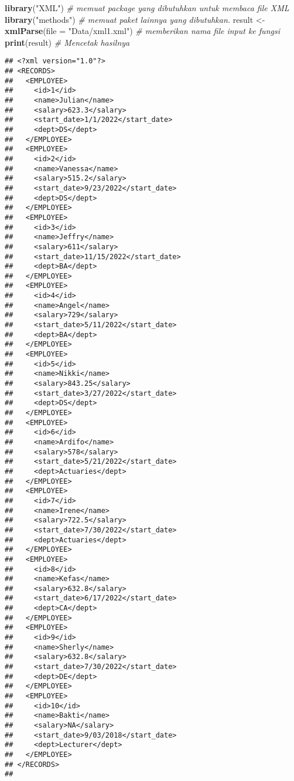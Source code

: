 \documentclass[
]{book}
\newenvironment{Shaded}{\begin{snugshade}}{\end{snugshade}}
\newcommand{\CommentTok}[1]{\textcolor[rgb]{0.56,0.35,0.01}{\textit{#1}}}
\newcommand{\DataTypeTok}[1]{\textcolor[rgb]{0.13,0.29,0.53}{#1}}
\newcommand{\KeywordTok}[1]{\textcolor[rgb]{0.13,0.29,0.53}{\textbf{#1}}}
\newcommand{\NormalTok}[1]{#1}
\newcommand{\StringTok}[1]{\textcolor[rgb]{0.31,0.60,0.02}{#1}}
\begin{document}
\begin{Shaded}
\begin{Highlighting}[]
\KeywordTok{library}\NormalTok{(}\StringTok{"XML"}\NormalTok{)                                     }\CommentTok{# memuat package yang dibutuhkan untuk membaca file XML}
\KeywordTok{library}\NormalTok{(}\StringTok{"methods"}\NormalTok{)                                 }\CommentTok{# memuat paket lainnya yang dibutuhkan.}
\NormalTok{result <-}\StringTok{ }\KeywordTok{xmlParse}\NormalTok{(}\DataTypeTok{file =} \StringTok{"Data/xml1.xml"}\NormalTok{)         }\CommentTok{# memberikan nama file input ke fungsi}
\KeywordTok{print}\NormalTok{(result)                                      }\CommentTok{# Mencetak hasilnya}
\end{Highlighting}
\end{Shaded}

\begin{verbatim}
## <?xml version="1.0"?>
## <RECORDS>
##   <EMPLOYEE>
##     <id>1</id>
##     <name>Julian</name>
##     <salary>623.3</salary>
##     <start_date>1/1/2022</start_date>
##     <dept>DS</dept>
##   </EMPLOYEE>
##   <EMPLOYEE>
##     <id>2</id>
##     <name>Vanessa</name>
##     <salary>515.2</salary>
##     <start_date>9/23/2022</start_date>
##     <dept>DS</dept>
##   </EMPLOYEE>
##   <EMPLOYEE>
##     <id>3</id>
##     <name>Jeffry</name>
##     <salary>611</salary>
##     <start_date>11/15/2022</start_date>
##     <dept>BA</dept>
##   </EMPLOYEE>
##   <EMPLOYEE>
##     <id>4</id>
##     <name>Angel</name>
##     <salary>729</salary>
##     <start_date>5/11/2022</start_date>
##     <dept>BA</dept>
##   </EMPLOYEE>
##   <EMPLOYEE>
##     <id>5</id>
##     <name>Nikki</name>
##     <salary>843.25</salary>
##     <start_date>3/27/2022</start_date>
##     <dept>DS</dept>
##   </EMPLOYEE>
##   <EMPLOYEE>
##     <id>6</id>
##     <name>Ardifo</name>
##     <salary>578</salary>
##     <start_date>5/21/2022</start_date>
##     <dept>Actuaries</dept>
##   </EMPLOYEE>
##   <EMPLOYEE>
##     <id>7</id>
##     <name>Irene</name>
##     <salary>722.5</salary>
##     <start_date>7/30/2022</start_date>
##     <dept>Actuaries</dept>
##   </EMPLOYEE>
##   <EMPLOYEE>
##     <id>8</id>
##     <name>Kefas</name>
##     <salary>632.8</salary>
##     <start_date>6/17/2022</start_date>
##     <dept>CA</dept>
##   </EMPLOYEE>
##   <EMPLOYEE>
##     <id>9</id>
##     <name>Sherly</name>
##     <salary>632.8</salary>
##     <start_date>7/30/2022</start_date>
##     <dept>DE</dept>
##   </EMPLOYEE>
##   <EMPLOYEE>
##     <id>10</id>
##     <name>Bakti</name>
##     <salary>NA</salary>
##     <start_date>9/03/2018</start_date>
##     <dept>Lecturer</dept>
##   </EMPLOYEE>
## </RECORDS>
## 
\end{verbatim}
\end{document}
